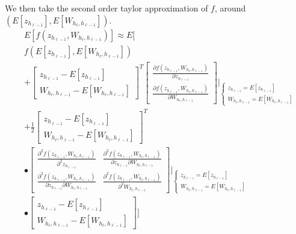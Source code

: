 We then take the second order taylor approximation of $f$, around $(E[z_{h_{\ell-1}}], E[W_{h_{\ell}, h_{\ell-1}}])$.
\begin{equation}
\begin{aligned}
&E[f(z_{h_{\ell-1}}, W_{h_{\ell}, h_{\ell-1}})] \approx
E\Bigg[\\
&f(E[z_{h_{\ell-1}}], E[W_{h_{\ell}, h_{\ell-1}}])\\
&+ \begin{bmatrix}
z_{h_{\ell-1}} - E[z_{h_{\ell-1}}] \\ W_{h_{\ell}, h_{\ell-1}} - E[W_{h_{\ell}, h_{\ell-1}}]
\end{bmatrix}^T \begin{bmatrix}
\frac{\partial f(z_{h_{\ell-1}}, W_{h_{\ell}, h_{\ell-1}})}{\partial z_{h_{\ell-1}}} \\
\frac{\partial f(z_{h_{\ell-1}}, W_{h_{\ell}, h_{\ell-1}})}{\partial W_{h_{\ell}, h_{\ell-1}}}
\end{bmatrix} \Bigg\rvert_{
\begin{cases}
z_{h_{\ell-1}} = E[z_{h_{\ell-1}}] \\
W_{h_{\ell}, h_{\ell-1}} = E[W_{h_{\ell}, h_{\ell-1}}]
\end{cases}
} \\
&+ \frac{1}{2} \begin{bmatrix}
z_{h_{\ell-1}} - E[z_{h_{\ell-1}}] \\ W_{h_{\ell}, h_{\ell-1}} - E[W_{h_{\ell}, h_{\ell-1}}]
\end{bmatrix}^T \\
&\bullet \begin{bmatrix}
\frac{\partial^2 f(z_{h_{\ell-1}}, W_{h_{\ell}, h_{\ell-1}})}{\partial^2 z_{h_{\ell-1}}} & \frac{\partial^2 f(z_{h_{\ell-1}}, W_{h_{\ell}, h_{\ell-1}})}{\partial z_{h_{\ell-1}} \partial W_{h_{\ell}, h_{\ell-1}}} \\
\frac{\partial^2 f(z_{h_{\ell-1}}, W_{h_{\ell}, h_{\ell-1}})}{\partial z_{h_{\ell-1}} \partial W_{h_{\ell}, h_{\ell-1}}} & \frac{\partial^2 f(z_{h_{\ell-1}}, W_{h_{\ell}, h_{\ell-1}})}{\partial^2 W_{h_{\ell}, h_{\ell-1}}}
\end{bmatrix} \Bigg\rvert_{
\begin{cases}
z_{h_{\ell-1}} = E[z_{h_{\ell-1}}] \\
W_{h_{\ell}, h_{\ell-1}} = E[W_{h_{\ell}, h_{\ell-1}}]
\end{cases}
} \\
&\bullet \begin{bmatrix}
z_{h_{\ell-1}} - E[z_{h_{\ell-1}}] \\ W_{h_{\ell}, h_{\ell-1}} - E[W_{h_{\ell}, h_{\ell-1}}]
\end{bmatrix}\Bigg]
\end{aligned}
\end{equation}

